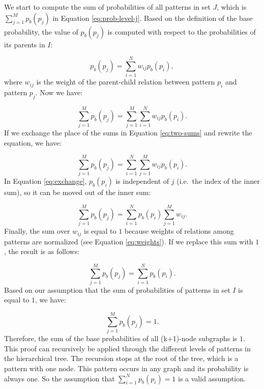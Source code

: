 We start to compute the sum of probabilities of all patterns in set $J$, which is $\sum_{j=1}^M p_b(p_j)$ in Equation \ref{eq:prob-level-j}.
Based on the definition of the base probability, the value of
$p_b(p_j)$ is computed with respect to the probabilities of its parents in $I$:

\begin{equation}
  p_b(p_j)=\sum_{i=1}^N w_{ij}p_b(p_i),
\end{equation}
where $w_{ij}$ is the weight of the \mbox{parent-child} relation between pattern $p_i$ and pattern $p_j$. 
Now we have:

\begin{equation}
\label{eq:two-sums}
\sum_{j=1}^M p_b(p_j) = \sum_{j=1}^M\sum_{i=1}^N w_{ij}p_b(p_i).
\end{equation}
%
If we exchange the place of the sums in Equation \ref{eq:two-sums} and rewrite the equation, we have: 

\begin{equation}
\label{eq:exchange}
\sum_{j=1}^M p_b(p_j) = \sum_{i=1}^N \sum_{j=1}^M w_{ij}p_b(p_i).
\end{equation}
%
In Equation \ref{eq:exchange}, $p_b(p_i)$ is independent of $j$ (i.e.\ the index of the inner sum), so it can be moved out of the inner sum:

\begin{equation}
\sum_{j=1}^M p_b(p_j) = \sum_{i=1}^N p_b(p_i) \sum_{j=1}^M w_{ij}.
\end{equation}
%
Finally, the sum over $w_{ij}$ is equal to $1$ because weights of relations among patterns are normalized (see Equation \ref{eq:weights}).   
If we replace this sum with $1$, the result is as follows:

\begin{equation}
\sum_{j=1}^M p_b(p_j) = \sum_{i=1}^N p_b(p_i).
\end{equation}
%
Based on our assumption that the sum of probabilities of patterns in set $I$ is equal to $1$, we have: 

\begin{equation}
\sum_{j=1}^M p_b(p_j) = 1.
\end{equation}
%
Therefore, the sum of the base probabilities of all (k+1)-node subgraphs is $1$. 
This proof can recursively be applied through the different levels of patterns in the hierarchical tree. 
The recursion stops at the root of the tree, which is a pattern with one node. 
This pattern occurs in any graph and its probability is always one. 
So the assumption that $\sum_{i=1}^N p_b(p_i) = 1$ is a valid assumption. 
\QEDB

